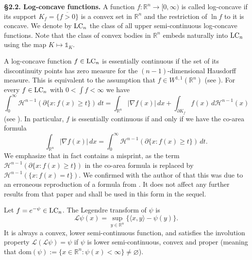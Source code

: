 \documentclass[11pt,leqno]{article}
\theoremstyle{definition}
\theoremstyle{remark}
\numberwithin{equation}{section}
\newcommand{\gr}{\geqslant}
\newcommand{\1}{\textbf{1}}
\begin{document}
\bigskip 

\noindent \textbf{\S 2.2. Log-concave functions.} A function $f:\mathbb R^n \rightarrow [0,\infty)$ is called log-concave if its support $K_f=\overline{\{f>0\}}$ 
is a convex set in ${\mathbb R}^n$ and the restriction of $\ln{f}$ to it is concave. 
We denote by ${\rm LC}_{n}$ the class of all upper semi-continuous log-concave functions. Note
that the class of convex bodies in $\mathbb{R}^{n}$ embeds naturally into ${\rm LC}_{n}$ using the map 
$K\mapsto \mathds{1}_{K}$. 

A log-concave function $f\in {\rm LC}_n$ is essentially continuous if the set of its discontinuity points has zero measure 
for the $(n-1)$-dimensional Hausdorff measure. This is equivalent to the assumption that $f\in W^{1,1}(\mathbb{R}^n)$ (see \cite[Remark~3.3]{Rotem-2022}). 
For every $f\in {\rm LC}_n$ with $0<\int f<\infty$ we have
\begin{equation} \label{eq:gen-coarea}
\int_{0}^{\infty} \mathcal H^{n-1}(\partial\{x:f(x)\gr t\})\,dt=\int_{\mathbb{R}^n}|\nabla f(x)|\,dx+\int_{\partial K_f}f(x)\,d\mathcal{H}^{n-1}(x)
\end{equation}
(see \cite[Theorem~3.2]{Rotem-2022}). In particular, $f$ is essentially continuous if and only if we have the co-area formula
\begin{equation}\label{eq:coarea}\int_{\mathbb{R}^n}|\nabla f(x)|\,dx= \int_{0}^{\infty} \mathcal H^{n-1}(\partial\{x:f(x)\gr t\})\,dt.\end{equation}
We emphasize that \cite[Theorem~3.2]{Rotem-2022} in fact contains a misprint, as the term $\mathcal H^{n-1}(\partial\{x:f(x)\gr t\})$ in the co-area formula is replaced by $\mathcal H^{n-1}(\{x:f(x) = t\})$. We confirmed with the author of \cite{Rotem-2022} that this was due to an erroneous reproduction of a formula from \cite[Section~5.5]{Evans}. It does not affect any further results from that paper and shall be used in this form in the sequel.

Let $f=e^{-\psi}\in {\rm LC}_n$. The Legendre transform of $\psi$ is
$$\mathcal{L}\psi(x)= \sup_{y\in\mathbb{R}^n}\{ \langle x,y\rangle - \psi(y)\}.$$
It is always a convex, lower semi-continuous function, and satisfies the involution property 
$\mathcal{L}(\mathcal{L}\psi)=\psi$ if $\psi$ is lower semi-continuous, convex and proper (meaning
that $\mathrm{dom}(\psi) := \{x \in \mathbb{R}^n : \psi(x) < \infty\} \neq \varnothing$). 
\end{document}
